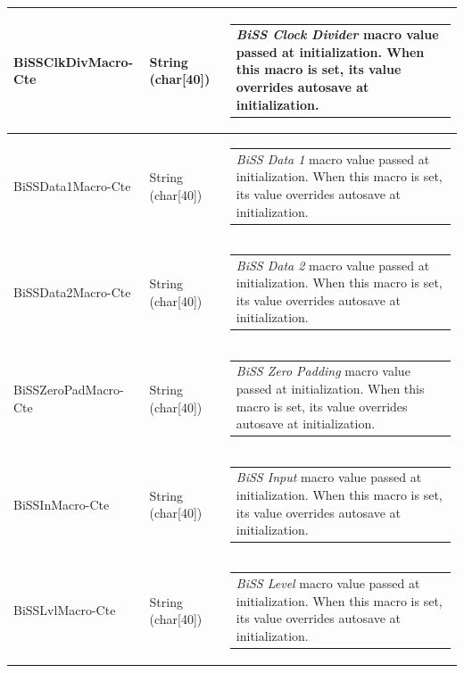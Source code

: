 \documentclass[openany]{article}
\begin{document}
\begin{longtable}{| m{4.5cm} m{2.5cm}  m{8.5cm} |}
        BiSSClkDivMacro-Cte & String (char[40]) & \begin{tabular}{@{}m{6cm}@{}}
                \emph{BiSS Clock Divider} macro value passed at initialization. When this macro is set, its value overrides autosave at initialization.
            \end{tabular} \hypertarget{pv:biss-data-1--macro-cte}{}\\ \hline
        BiSSData1Macro-Cte & String (char[40]) & \begin{tabular}{@{}m{6cm}@{}}
                \emph{BiSS Data 1} macro value passed at initialization. When this macro is set, its value overrides autosave at initialization.
            \end{tabular} \hypertarget{pv:biss-data-2-macro-cte}{}\\ \hline
        BiSSData2Macro-Cte & String (char[40]) & \begin{tabular}{@{}m{6cm}@{}}
                \emph{BiSS Data 2} macro value passed at initialization. When this macro is set, its value overrides autosave at initialization.
            \end{tabular} \hypertarget{pv:biss-zero-pad-macro-cte}{}\\ \hline
        BiSSZeroPadMacro-Cte & String (char[40]) & \begin{tabular}{@{}m{6cm}@{}}
                \emph{BiSS Zero Padding} macro value passed at initialization. When this macro is set, its value overrides autosave at initialization.
            \end{tabular} \hypertarget{pv:biss-in-macro-cte}{}\\ \hline
        BiSSInMacro-Cte & String (char[40]) & \begin{tabular}{@{}m{6cm}@{}}
                \emph{BiSS Input} macro value passed at initialization. When this macro is set, its value overrides autosave at initialization.
            \end{tabular} \hypertarget{pv:biss-lvl-macro-cte}{}\\ \hline
        BiSSLvlMacro-Cte & String (char[40]) & \begin{tabular}{@{}m{6cm}@{}}
                \emph{BiSS Level} macro value passed at initialization. When this macro is set, its value overrides autosave at initialization\cite{mtrrec}.
            \end{tabular} \hypertarget{}{}\\ \hline
    \end{longtable}
\end{document}
